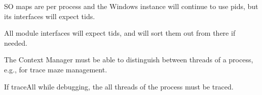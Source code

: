 \documentclass[titlepage]{article}
\begin{document}
\begin{appendices}
SO maps are per process and the Windows instance will continue to use pids, but its
interfaces will expect tids.

All module interfaces will expect tids, and will sort them out from there if needed.

The Context Manager must be able to distinguish between threads of a process, e.g., for trace maze management.

If traceAll while debugging, the all threads of the process must be traced.


\end{appendices}
\end{document}
